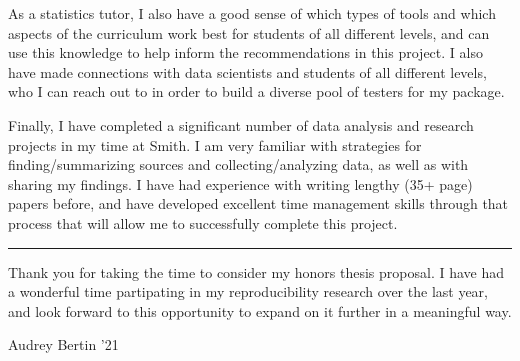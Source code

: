 \documentclass[12pt]{article}
\begin{document}
As a statistics tutor, I also have a good sense of which types of tools
and which aspects of the curriculum work best for students of all
different levels, and can use this knowledge to help inform the
recommendations in this project. I also have made connections with data
scientists and students of all different levels, who I can reach out to
in order to build a diverse pool of testers for my package.

Finally, I have completed a significant number of data analysis and
research projects in my time at Smith. I am very familiar with
strategies for finding/summarizing sources and collecting/analyzing
data, as well as with sharing my findings. I have had experience with
writing lengthy (35+ page) papers before, and have developed excellent
time management skills through that process that will allow me to
successfully complete this project.

\begin{center}\rule{0.5\linewidth}{\linethickness}\end{center}

Thank you for taking the time to consider my honors thesis proposal. I
have had a wonderful time partipating in my reproducibility research
over the last year, and look forward to this opportunity to expand on it
further in a meaningful way.

Audrey Bertin '21



\end{document}
